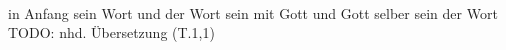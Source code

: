 \begin{exe}
\ex \label{ex:T10} \gll {}                 \\
{in} {Anfang} {sein} {Wort} {und} {der} {Wort} {sein} { mit} {Gott} {und} {Gott} {selber} {sein} {der} {Wort} {}\\
\glt TODO: nhd. Übersetzung (T.1,1)
\end{exe}
